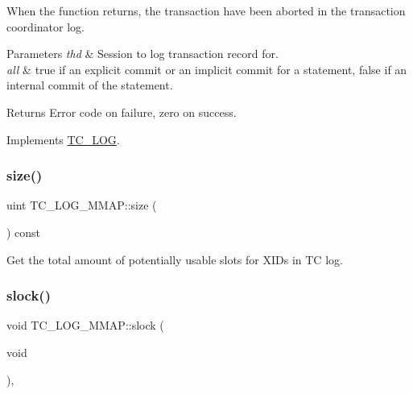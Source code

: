 When the function returns, the transaction have been aborted in the transaction coordinator log.


\begin{DoxyParams}{Parameters}
{\em thd} & Session to log transaction record for.\\
\hline
{\em all} & {\ttfamily true} if an explicit commit or an implicit commit for a statement, {\ttfamily false} if an internal commit of the statement.\\
\hline
\end{DoxyParams}
\begin{DoxyReturn}{Returns}
Error code on failure, zero on success. 
\end{DoxyReturn}


Implements \mbox{\hyperlink{classTC__LOG_abf637f1bbf02c6f8e4f69aa2f5e2d362}{T\+C\+\_\+\+L\+OG}}.

\mbox{\label{classTC__LOG__MMAP_a242ceec9296d75dcfc09a9109ffa6a80}} 
\subsubsection{\texorpdfstring{size()}{size()}}
{\footnotesize\ttfamily uint T\+C\+\_\+\+L\+O\+G\+\_\+\+M\+M\+A\+P\+::size (\begin{DoxyParamCaption}{ }\end{DoxyParamCaption}) const}

Get the total amount of potentially usable slots for X\+I\+Ds in TC log. \mbox{\label{classTC__LOG__MMAP_a8c90387699139f5e9d244e60c5a126a1}} 
\subsubsection{\texorpdfstring{slock()}{slock()}}
{\footnotesize\ttfamily void T\+C\+\_\+\+L\+O\+G\+\_\+\+M\+M\+A\+P\+::slock (\begin{DoxyParamCaption}\item[{void}]{ }\end{DoxyParamCaption})\hspace{0.3cm}{\ttfamily [inline]}, {\ttfamily [virtual]}}

